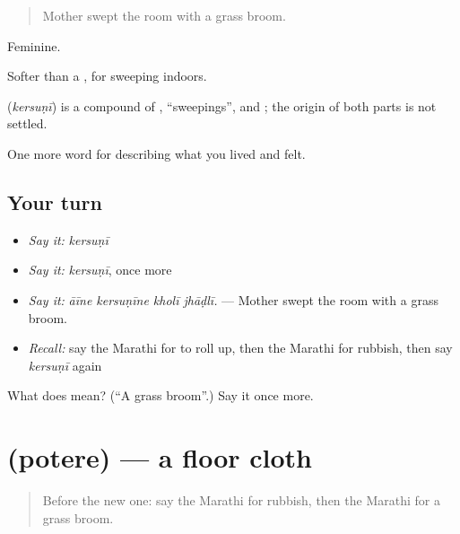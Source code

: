 \begin{quote}
Mother swept the room with a grass broom.
\end{quote}

Feminine.

Softer than a , for sweeping indoors.

\begin{cousinweb}
\textbf{} (\emph{kersuṇī}) is a compound of , \textquotedblleft{}sweepings\textquotedblright{}, and ; the origin of both parts is not settled.
\end{cousinweb}

\begin{grammarlens}[title={What you've built}]
One more word for describing what you lived and felt.
\end{grammarlens}

\subsection*{Your turn}
\begin{itemize}
\raggedright
  \item \emph{Say it:} \emph{kersuṇī}
  \item \emph{Say it:} \emph{kersuṇī}, once more
  \item \emph{Say it:} \emph{āīne kersuṇīne kholī jhāḍlī.} — Mother swept the room with a grass broom.
  \item \emph{Recall:} say the Marathi for to roll up, then the Marathi for rubbish, then say \emph{kersuṇī} again
\end{itemize}

\begin{tcolorbox}[breakable,colback=teal!4,colframe=teal!35!black,title={Before you move on}]
What does  mean? (\textquotedblleft{}A grass broom\textquotedblright{}.) Say it once more.
\end{tcolorbox}
\section[\texorpdfstring{\mr{पोतेरे} (potere)}{पोतेरे (potere)}]{ (potere) — a floor cloth}

\label{lesson:MR-C524-potere}



\begin{quote}
Before the new one: say the Marathi for rubbish, then the Marathi for a grass broom.
\end{quote}

